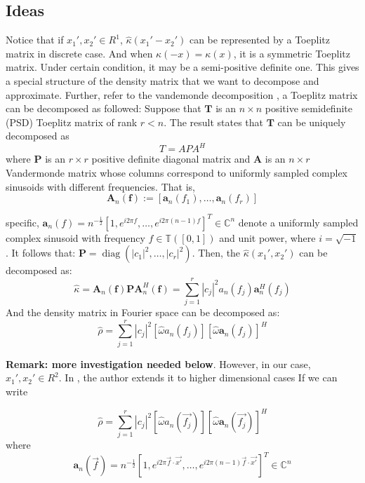 \documentclass{article}
\numberwithin{equation}{section}
\begin{document}
  
  \subsection{Ideas}
  Notice that if $x_1',x_2'\in R^1$, $\hat{\kappa}(x_1' - x_2')$ can be represented by a Toeplitz matrix in discrete case. And when $\kappa(-x) = \kappa(x) $, it is a symmetric Toeplitz matrix. Under certain condition, it may be a semi-positive definite one. This gives a special structure of the density matrix that we want to decompose and approximate. Further, refer to the vandemonde decomposition \cite{multilevel vandemonde decomposition}, a Toeplitz matrix can be decomposed as followed:
   	Suppose that $\boldsymbol{T}$ is an $n \times n$ positive semidefinite (PSD) Toeplitz matrix of rank $r<n$. The result states that $\boldsymbol{T}$ can be uniquely decomposed as
  	$$
  	T=A P A^{H}
  	$$
  	where $\boldsymbol{P}$ is an $r \times r$ positive definite diagonal matrix and $\boldsymbol{A}$ is an $n \times r$ Vandermonde matrix whose columns correspond to uniformly sampled complex sinusoids with different frequencies. That is, 
  	$$
  	\boldsymbol{A}_{n}(\boldsymbol{f}):=\left[\boldsymbol{a}_{n}\left(f_{1}\right), \ldots, \boldsymbol{a}_{n}\left(f_{r}\right)\right]
  	$$

specific,  $\boldsymbol{a}_{n}(f)=n^{-\frac{1}{2}}\left[1, e^{i 2 \pi f}, \ldots, e^{i 2 \pi(n-1) f}\right]^{T} \in \mathbb{C}^{n}$ denote a uniformly sampled complex sinusoid with frequency $f \in \mathbb{T} ([0,1])$ and unit power, where $i=\sqrt{-1}$. 
It follows that:
$\boldsymbol{P}=\operatorname{diag}\left(\left|c_{1}\right|^{2}, \ldots,\left|c_{r}\right|^{2}\right)$. Then, the $\hat{\kappa}(x_1',x_2')$ can be decomposed as:
$$
\hat{\kappa}=\boldsymbol{A}_{n}(\boldsymbol{f}) \boldsymbol{P} \boldsymbol{A}_{n}^{H}(\boldsymbol{f})=\sum_{j=1}^{r}\left|c_{j}\right|^{2} a_{n}\left(f_{j}\right) \boldsymbol{a}_{n}^{H}\left(f_{j}\right)
$$
And the density matrix in Fourier space can be decomposed as:
$$
\hat{\rho} = \sum_{j=1}^{r}\left|c_{j}\right|^{2} [\hat{\omega} a_{n}\left(f_{j}\right)][\hat{\omega} \boldsymbol{a}_{n}\left(f_{j}\right)]^{H}
$$

\textbf{Remark: more investigation needed below}. 
However, in our case, $x_1',x_2' \in R^2$. In \cite{multilevel vandemonde decomposition}, the author extends it to higher dimensional cases 
If we can write

$$
\hat{\rho} = \sum_{j=1}^{r}\left|c_{j}\right|^{2} [\hat{\omega} a_{n}\left(\overrightarrow{f_{j}}\right)][\hat{\omega} \boldsymbol{a}_{n}\left(\overrightarrow{f_{j}}\right)]^{H}
$$
where
 $$
\boldsymbol{a}_{n}(\overrightarrow{f})=n^{-\frac{1}{2}}\left[1, e^{i 2 \pi \overrightarrow{f} \cdot \overrightarrow{x'}} , \ldots, e^{i 2 \pi(n-1) \overrightarrow{f} \cdot \overrightarrow{x'} } \right]^{T} \in \mathbb{C}^{n}
$$ 
\end{document}
